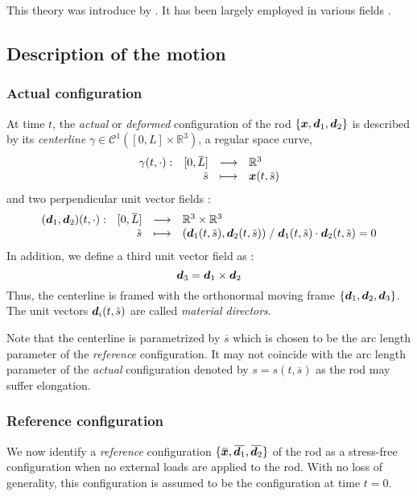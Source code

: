 This theory was introduce by \cite{Antman1974}. It has been largely employed in various fields \cite{Shi1995, Bergou2010}.

\subsection{Description of the motion}

\subsubsection{Actual configuration}

At time $t$, the \emph{actual} or \emph{deformed} configuration of the rod $\{{\boldsymbol{x}}, {\boldsymbol{d}_1}, {\boldsymbol{d}_2}\}$ is described by its \emph{centerline} $\gamma \in \mathcal{C}^1([0,{L}]\times \mathbb{R}^3)$, a regular space curve, 
\begin{equation}
	\fonctionL{\gamma(t, \cdot)}{[0,\overbar{L}]}{\mathbb{R}^3}{\overbar{s}}{\vect{x}(t,\overbar{s})}
\end{equation}
and two perpendicular unit vector fields : 
\begin{equation}
	\fonctionL{(\vect{d}_1,\vect{d}_2)(t, \cdot)}{[0,\overbar{L}]}{\mathbb{R}^3 \times \mathbb{R}^3}{\overbar{s}}{(\vect{d}_1(t,\overbar{s}), \vect{d}_2(t,\overbar{s})) \; / \; 
	\vect{d}_1(t,\overbar{s}) \cdot \vect{d}_2(t,\overbar{s}) = 0
	}
\end{equation}
In addition, we define a third unit vector field as : 
\begin{equation}
	\boldsymbol{d}_3 = \boldsymbol{d}_1 \times \boldsymbol{d}_2
\end{equation}
Thus, the centerline is framed with the orthonormal moving frame $\{\boldsymbol{d}_1, \boldsymbol{d}_2, \boldsymbol{d}_3\}$. The unit vectors $\vect{d}_i(t,\overbar{s})$ are called \emph{material directors}.

Note that the centerline is parametrized by $\overbar{s}$ which is chosen to be the arc length parameter of the \emph{reference} configuration. It may not coincide with the arc length parameter of the \emph{actual} configuration denoted by $s = s(t, \overbar{s})$ as the rod may suffer elongation.

\subsubsection{Reference configuration}
We now identify a \emph{reference} configuration $\{\overbar{\vect{x}}, \overbar{\vect{d}_1}, \overbar{\vect{d}_2}\}$ of the rod as a stress-free configuration when no external loads are applied to the rod. With no loss of generality, this configuration is assumed to be the configuration at time $t=0$. 

